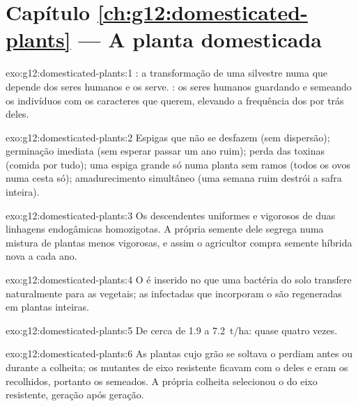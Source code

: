 \section*{Capítulo \ref{ch:g12:domesticated-plants} --- A planta domesticada}

\begin{solution}{exo:g12:domesticated-plants:1}
: a transformação de uma  silvestre numa que depende
dos seres humanos e os serve. : os seres humanos
guardando e semeando os indivíduos com os caracteres que querem,
elevando a frequência dos  por trás deles.
\end{solution}

\begin{solution}{exo:g12:domesticated-plants:2}
Espigas que não se desfazem (sem dispersão); germinação imediata (sem
esperar passar um ano ruim); perda das toxinas (comida por tudo); uma
espiga grande só numa planta sem ramos (todos os ovos numa cesta só);
amadurecimento simultâneo (uma semana ruim destrói a safra inteira).
\end{solution}

\begin{solution}{exo:g12:domesticated-plants:3}
Os descendentes uniformes e vigorosos de duas linhagens endogâmicas
homozigotas. A própria semente dele segrega numa mistura de plantas
menos vigorosas, e assim o agricultor compra semente híbrida nova a cada ano.
\end{solution}

\begin{solution}{exo:g12:domesticated-plants:4}
O  é inserido no  que uma bactéria do solo transfere
naturalmente para as  vegetais; as  infectadas que
incorporam o  são regeneradas em plantas inteiras.
\end{solution}

\begin{solution}{exo:g12:domesticated-plants:5}
De cerca de \num{1.9} a \qty{7.2}{t/ha}: quase quatro vezes.
\end{solution}

\begin{solution}{exo:g12:domesticated-plants:6}
As plantas cujo grão se soltava o perdiam antes ou durante a colheita;
os mutantes de eixo resistente ficavam com o deles e eram os
recolhidos, portanto os semeados. A própria colheita selecionou o 
do eixo resistente, geração após geração.
\end{solution}

